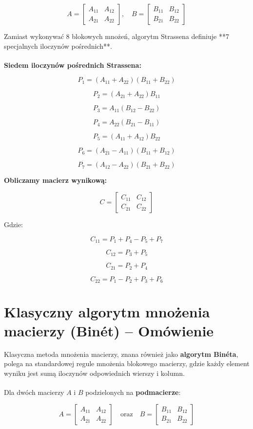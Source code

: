 \documentclass{article}
\begin{document}
\[
A =
\begin{bmatrix}
A_{11} & A_{12} \\
A_{21} & A_{22}
\end{bmatrix}, 
\quad
B =
\begin{bmatrix}
B_{11} & B_{12} \\
B_{21} & B_{22}
\end{bmatrix}
\]

Zamiast wykonywać 8 blokowych mnożeń, algorytm Strassena definiuje **7 specjalnych iloczynów pośrednich**.\\
\\
\textbf{Siedem iloczynów pośrednich Strassena:}

\[
P_1 = (A_{11} + A_{22})(B_{11} + B_{22})
\]

\[
P_2 = (A_{21} + A_{22}) B_{11}
\]

\[
P_3 = A_{11} (B_{12} - B_{22})
\]

\[
P_4 = A_{22} (B_{21} - B_{11})
\]

\[
P_5 = (A_{11} + A_{12}) B_{22}
\]

\[
P_6 = (A_{21} - A_{11}) (B_{11} + B_{12})
\]

\[
P_7 = (A_{12} - A_{22}) (B_{21} + B_{22})
\]

\textbf{Obliczamy macierz wynikową:}


\[
C =
\begin{bmatrix}
C_{11} & C_{12} \\
C_{21} & C_{22}
\end{bmatrix}
\]

Gdzie:

\[
C_{11} = P_1 + P_4 - P_5 + P_7
\]

\[
C_{12} = P_3 + P_5
\]

\[
C_{21} = P_2 + P_4
\]

\[
C_{22} = P_1 - P_2 + P_3 + P_6
\]

\section{Klasyczny algorytm mnożenia macierzy (Binét) – Omówienie}
Klasyczna metoda mnożenia macierzy, znana również jako \textbf{algorytm Binéta}, polega na standardowej regule mnożenia blokowego macierzy, gdzie każdy element wyniku jest sumą iloczynów odpowiednich wierszy i kolumn.\\
\\
Dla dwóch macierzy \( A \) i \( B \) podzielonych na \textbf{podmacierze}:

\[
A =
\begin{bmatrix}
A_{11} & A_{12} \\
A_{21} & A_{22}
\end{bmatrix}
\quad \text{oraz} \quad
B =
\begin{bmatrix}
B_{11} & B_{12} \\
B_{21} & B_{22}
\end{bmatrix}
\]
\end{document}

